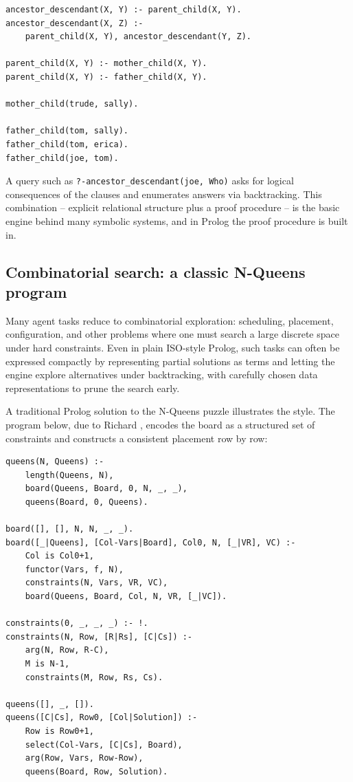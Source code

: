 \begin{verbatim}
ancestor_descendant(X, Y) :- parent_child(X, Y).
ancestor_descendant(X, Z) :-
    parent_child(X, Y), ancestor_descendant(Y, Z).

parent_child(X, Y) :- mother_child(X, Y).
parent_child(X, Y) :- father_child(X, Y).

mother_child(trude, sally).

father_child(tom, sally).
father_child(tom, erica).
father_child(joe, tom).
\end{verbatim}

\noindent A query such as \texttt{?-ancestor\_descendant(joe,\,Who)} asks for logical consequences of the clauses and enumerates answers via backtracking. This combination -- explicit relational structure plus a proof procedure -- is the basic engine behind many symbolic systems, and in Prolog the proof procedure is built in.

\subsection{Combinatorial search: a classic N-Queens program}
\label{sec:symbolic-nqueens}

Many agent tasks reduce to combinatorial exploration: scheduling, placement, configuration, and other problems where one must search a large discrete space under hard constraints. Even in plain ISO-style Prolog, such tasks can often be expressed compactly by representing partial solutions as terms and letting the engine explore alternatives under backtracking, with carefully chosen data representations to prune the search early.

A traditional Prolog solution to the N-Queens puzzle illustrates the style. The program below, due to Richard \citet{okeefe1990craft}, encodes the board as a structured set of constraints and constructs a consistent placement row by row:

\begin{verbatim}
queens(N, Queens) :-
    length(Queens, N),
    board(Queens, Board, 0, N, _, _),
    queens(Board, 0, Queens).

board([], [], N, N, _, _).
board([_|Queens], [Col-Vars|Board], Col0, N, [_|VR], VC) :-
    Col is Col0+1,
    functor(Vars, f, N),
    constraints(N, Vars, VR, VC),
    board(Queens, Board, Col, N, VR, [_|VC]).

constraints(0, _, _, _) :- !.
constraints(N, Row, [R|Rs], [C|Cs]) :-
    arg(N, Row, R-C),
    M is N-1,
    constraints(M, Row, Rs, Cs).

queens([], _, []).
queens([C|Cs], Row0, [Col|Solution]) :-
    Row is Row0+1,
    select(Col-Vars, [C|Cs], Board),
    arg(Row, Vars, Row-Row),
    queens(Board, Row, Solution).
\end{verbatim}

